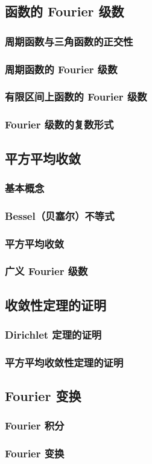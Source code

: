 

\subsection{函数的 Fourier 级数}
\subsubsection{周期函数与三角函数的正交性}
\subsubsection{周期函数的 Fourier 级数}
\subsubsection{有限区间上函数的 Fourier 级数}
\subsubsection{Fourier 级数的复数形式}

\subsection{平方平均收敛}
\subsubsection{基本概念}
\subsubsection{Bessel（贝塞尔）不等式}
\subsubsection{平方平均收敛}
\subsubsection{广义 Fourier 级数}

\subsection{收敛性定理的证明}
\subsubsection{Dirichlet 定理的证明}
\subsubsection{平方平均收敛性定理的证明}

\subsection{Fourier 变换}
\subsubsection{Fourier 积分}
\subsubsection{Fourier 变换}
